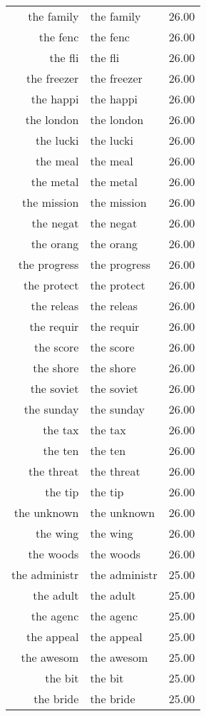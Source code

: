 \begin{table}[ht]
\begin{tabular}{rlr}
  the family & the family & 26.00 \\ 
  the fenc & the fenc & 26.00 \\ 
  the fli & the fli & 26.00 \\ 
  the freezer & the freezer & 26.00 \\ 
  the happi & the happi & 26.00 \\ 
  the london & the london & 26.00 \\ 
  the lucki & the lucki & 26.00 \\ 
  the meal & the meal & 26.00 \\ 
  the metal & the metal & 26.00 \\ 
  the mission & the mission & 26.00 \\ 
  the negat & the negat & 26.00 \\ 
  the orang & the orang & 26.00 \\ 
  the progress & the progress & 26.00 \\ 
  the protect & the protect & 26.00 \\ 
  the releas & the releas & 26.00 \\ 
  the requir & the requir & 26.00 \\ 
  the score & the score & 26.00 \\ 
  the shore & the shore & 26.00 \\ 
  the soviet & the soviet & 26.00 \\ 
  the sunday & the sunday & 26.00 \\ 
  the tax & the tax & 26.00 \\ 
  the ten & the ten & 26.00 \\ 
  the threat & the threat & 26.00 \\ 
  the tip & the tip & 26.00 \\ 
  the unknown & the unknown & 26.00 \\ 
  the wing & the wing & 26.00 \\ 
  the woods & the woods & 26.00 \\ 
  the administr & the administr & 25.00 \\ 
  the adult & the adult & 25.00 \\ 
  the agenc & the agenc & 25.00 \\ 
  the appeal & the appeal & 25.00 \\ 
  the awesom & the awesom & 25.00 \\ 
  the bit & the bit & 25.00 \\ 
  the bride & the bride & 25.00 \\ 

\end{tabular}
\end{table}
